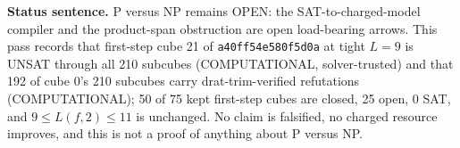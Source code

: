 \documentclass[11pt]{article}
\begin{document}
\bigskip
\noindent\textbf{Status sentence.} P versus NP remains OPEN: the SAT-to-charged-model compiler and the product-span obstruction are open load-bearing arrows. This pass records that first-step cube 21 of \texttt{a40ff54e580f5d0a} at tight $L=9$ is UNSAT through all 210 subcubes (COMPUTATIONAL, solver-trusted) and that 192 of cube 0's 210 subcubes carry drat-trim-verified refutations (COMPUTATIONAL); 50 of 75 kept first-step cubes are closed, 25 open, 0 SAT, and $9\le L(f,2)\le 11$ is unchanged. No claim is falsified, no charged resource improves, and this is not a proof of anything about P versus NP.
\end{document}
